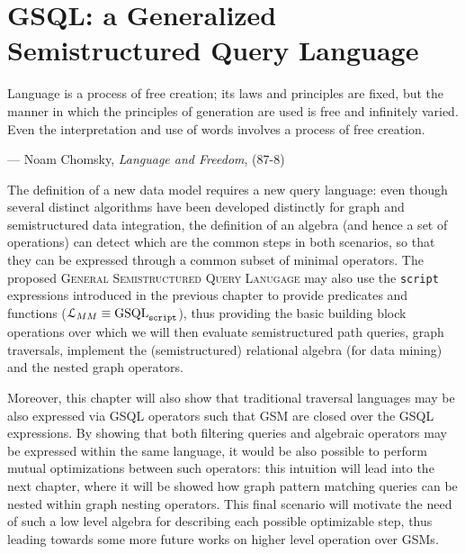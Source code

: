 \chapter{GSQL: a Generalized Semistructured Query Language}\label{cha:NGQL}
\epigraph{Language is a process of free creation; its laws and principles are fixed, but the manner in which the principles of generation are used is free and infinitely varied. Even the interpretation and use of words involves a process of free creation.}{--- Noam Chomsky, \textit{Language and Freedom}, (87-8)}


The definition of a new data model requires a new  query language: even though several distinct algorithms have been developed distinctly for graph and semistructured data integration, the definition of an algebra (and hence a set of operations) can detect which are the common steps in both scenarios, so that they can be expressed through a common subset of minimal operators. %
The proposed \textsc{General Semistructured Query Lanugage} may also use the \texttt{script} expressions introduced in the previous chapter to provide predicates and functions ($\langg_{\metamodel}\equiv \textup{GSQL}_{\texttt{script}}$), thus providing the basic building block operations over which we will then evaluate semistructured path queries, graph traversals, implement the (semistructured) relational algebra (for data mining) and the nested graph operators.

Moreover, this chapter will also show that traditional traversal languages may be also  expressed via GSQL operators such that GSM are closed over the GSQL expressions. By showing that both filtering queries and algebraic operators may be expressed within the same language, it would be also possible to perform mutual optimizations between such operators: this intuition will lead into the next chapter, where it will be showed how graph pattern matching queries can be nested within graph nesting operators. This final scenario will motivate the need of such a low level algebra for describing each possible optimizable step, thus leading towards some more future works on higher level operation over GSMs.


